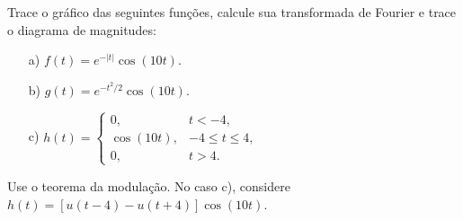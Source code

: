 \begin{Exercise} Trace o gráfico das seguintes funções, calcule sua transformada de Fourier e trace o diagrama de magnitudes: 
\begin{itemize}
\item[a)] $f(t)=e^{-|t|}\cos(10t)$.
\item[b)] $g(t)=e^{-t^2/2}\cos(10t)$.
\item[c)] $h(t)=\left\{
\begin{array}{ll}
0, &t<-4,\\
\cos(10t), &-4\leq t \leq 4,\\
0,&t>4.
\end{array} \right.$
\end{itemize}
\end{Exercise}
\begin{resp}
 Use o teorema da modulação. No caso c), considere $h(t)=\left[u(t-4)-u(t+4)\right]\cos(10t)$.
\end{resp}


%